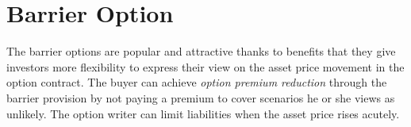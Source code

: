\chapter{Barrier Option}
\label{Barrier}
The barrier options are popular and attractive thanks to benefits that they give investors more flexibility to express their view on the asset price movement in the option contract. The buyer can achieve {\itshape option premium reduction} through the barrier provision by not paying a premium to cover scenarios he or she views as unlikely. The option writer can limit liabilities when the asset price rises acutely.